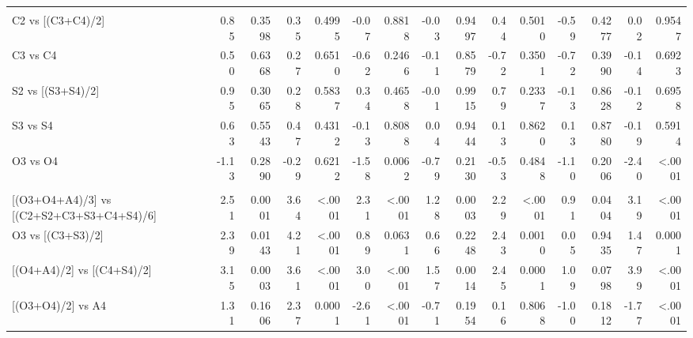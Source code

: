 \documentclass[
]{article}
\begin{document}
\begin{landscape}
\begin{table}
{\begin{threeparttable}
\begin{tabular}[t]{lr>{}r|r>{}r|r>{}r|r>{}r|r>{}r|r>{}r|rr}
\addlinespace[0.3em]
\multicolumn{15}{l}{\textbf{(A2) - Rotation system effects within individual crops}}\\
\hspace{1em}\hspace{1em}C2 vs [(C3+C4)/2] & 0.85 & 0.3598 & 0.35 & 0.4995 & -0.07 & 0.8818 & -0.03 & 0.9497 & 0.44 & 0.5010 & -0.59 & 0.4277 & 0.02 & 0.9547\\
\hspace{1em}\hspace{1em}C3 vs C4 & 0.50 & 0.6368 & 0.27 & 0.6510 & -0.62 & 0.2466 & -0.11 & 0.8579 & -0.72 & 0.3501 & -0.72 & 0.3990 & -0.14 & 0.6923\\
\hspace{1em}\hspace{1em}S2 vs [(S3+S4)/2] & 0.95 & 0.3065 & 0.28 & 0.5837 & 0.34 & 0.4658 & -0.01 & 0.9915 & 0.79 & 0.2337 & -0.13 & 0.8628 & -0.12 & 0.6958\\
\hspace{1em}\hspace{1em}S3 vs S4 & 0.63 & 0.5543 & 0.47 & 0.4312 & -0.13 & 0.8088 & 0.04 & 0.9444 & 0.13 & 0.8620 & 0.13 & 0.8780 & -0.19 & 0.5914\\
\hspace{1em}\hspace{1em}O3 vs O4 & -1.13 & 0.2890 & -0.29 & 0.6212 & -1.58 & 0.0062 & -0.79 & 0.2130 & -0.53 & 0.4848 & -1.10 & 0.2006 & -2.40 & <.0001\\
\addlinespace[0.3em]
\multicolumn{15}{l}{\textbf{(A3) - Crop type effects}}\\
\hspace{1em}\hspace{1em}{}[(O3+O4+A4)/3] vs [(C2+S2+C3+S3+C4+S4)/6] & 2.51 & 0.0001 & 3.64 & <.0001 & 2.31 & <.0001 & 1.28 & 0.0003 & 2.29 & <.0001 & 0.91 & 0.0404 & 3.19 & <.0001\\
\hspace{1em}\hspace{1em}O3 vs [(C3+S3)/2] & 2.39 & 0.0143 & 4.21 & <.0001 & 0.89 & 0.0631 & 0.66 & 0.2248 & 2.43 & 0.0010 & 0.05 & 0.9435 & 1.47 & 0.0001\\
\hspace{1em}\hspace{1em}{}[(O4+A4)/2] vs [(C4+S4)/2] & 3.15 & 0.0003 & 3.61 & <.0001 & 3.00 & <.0001 & 1.57 & 0.0014 & 2.45 & 0.0001 & 1.09 & 0.0798 & 3.99 & <.0001\\
\hspace{1em}\hspace{1em}{}[(O3+O4)/2] vs A4 & 1.31 & 0.1606 & 2.37 & 0.0001 & -2.61 & <.0001 & -0.71 & 0.1954 & 0.16 & 0.8068 & -1.00 & 0.1812 & -1.77 & <.0001\\

\end{tabular}
\end{threeparttable}}
\end{table}
\end{landscape}
\end{document}
